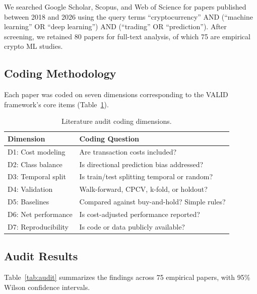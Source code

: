 \documentclass[preprint,12pt,authoryear]{elsarticle}
\begin{document}
We searched Google Scholar, Scopus, and Web of Science for papers published between 2018 and 2026 using the query terms ``cryptocurrency'' AND (``machine learning'' OR ``deep learning'') AND (``trading'' OR ``prediction''). After screening, we retained 80 papers for full-text analysis, of which 75 are empirical crypto ML studies.

\subsection{Coding Methodology}

Each paper was coded on seven dimensions corresponding to the VALID framework's core items (Table~\ref{tab:coding}).

\begin{table}[htbp]
\centering
\caption{Literature audit coding dimensions.}
\label{tab:coding}
\begin{tabular}{ll}
\toprule
Dimension & Coding Question \\
\midrule
D1: Cost modeling & Are transaction costs included? \\
D2: Class balance & Is directional prediction bias addressed? \\
D3: Temporal split & Is train/test splitting temporal or random? \\
D4: Validation & Walk-forward, CPCV, k-fold, or holdout? \\
D5: Baselines & Compared against buy-and-hold? Simple rules? \\
D6: Net performance & Is cost-adjusted performance reported? \\
D7: Reproducibility & Is code or data publicly available? \\
\bottomrule
\end{tabular}
\end{table}

\subsection{Audit Results}

Table~\ref{tab:audit} summarizes the findings across 75 empirical papers, with 95\% Wilson confidence intervals.
\end{document}
